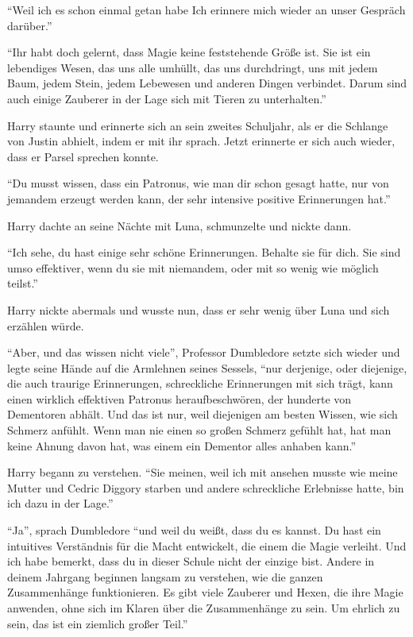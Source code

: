 \enquote{Weil ich es schon einmal getan habe \gst Ich erinnere mich wieder an unser Gespräch darüber.}

\enquote{Ihr habt doch gelernt, dass Magie keine feststehende Größe ist. Sie ist ein lebendiges Wesen, das uns alle umhüllt, das uns durchdringt, uns mit jedem Baum, jedem Stein, jedem Lebewesen und anderen Dingen verbindet. Darum sind auch einige Zauberer in der Lage sich mit Tieren zu unterhalten.}

Harry staunte und erinnerte sich an sein zweites Schuljahr, als er die Schlange von Justin abhielt, indem er mit ihr sprach. Jetzt erinnerte er sich auch wieder, dass er Parsel sprechen konnte.

\enquote{Du musst wissen, dass ein Patronus, wie man dir schon gesagt hatte, nur von jemandem erzeugt werden kann, der sehr intensive positive Erinnerungen hat.}

Harry dachte an seine Nächte mit Luna, schmunzelte und nickte dann.

\enquote{Ich sehe, du hast einige sehr schöne Erinnerungen. Behalte sie für dich. Sie sind umso effektiver, wenn du sie mit niemandem, oder mit so wenig wie möglich teilst.}

Harry nickte abermals und wusste nun, dass er sehr wenig über Luna und sich erzählen würde.

\enquote{Aber, und das wissen nicht viele}, Professor Dumbledore setzte sich wieder und legte seine Hände auf die Armlehnen seines Sessels, \enquote{nur derjenige, oder diejenige, die auch traurige Erinnerungen, schreckliche Erinnerungen mit sich trägt, kann einen wirklich effektiven Patronus heraufbeschwören, der hunderte von Dementoren abhält. Und das ist nur, weil diejenigen am besten Wissen, wie sich Schmerz anfühlt. Wenn man nie einen so großen Schmerz gefühlt hat, hat man keine Ahnung davon hat, was einem ein Dementor alles anhaben kann.}

Harry begann zu verstehen. \enquote{Sie meinen, weil ich mit ansehen musste wie meine Mutter und Cedric Diggory starben und andere schreckliche Erlebnisse hatte, bin ich dazu in der Lage.}

\enquote{Ja}, sprach Dumbledore \enquote{und weil du weißt, dass du es kannst. Du hast ein intuitives Verständnis für die Macht entwickelt, die einem die Magie verleiht. Und ich habe bemerkt, dass du in dieser Schule nicht der einzige bist. Andere in deinem Jahrgang beginnen langsam zu verstehen, wie die ganzen Zusammenhänge funktionieren. Es gibt viele Zauberer und Hexen, die ihre Magie anwenden, ohne sich im Klaren über die Zusammenhänge zu sein. Um ehrlich zu sein, das ist ein ziemlich großer Teil.}

